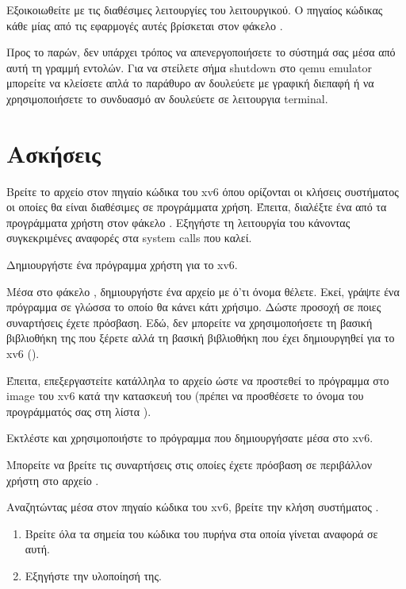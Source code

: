 \documentclass[18pt]{extarticle}
\begin{document}
Εξοικοιωθείτε με τις διαθέσιμες λειτουργίες του λειτουργικού. Ο πηγαίος κώδικας κάθε μίας από τις εφαρμογές αυτές βρίσκεται στον φάκελο .

Προς το παρών, δεν υπάρχει τρόπος να απενεργοποιήσετε το σύστημά σας μέσα από
αυτή τη γραμμή εντολών. Για να στείλετε σήμα shutdown στο qemu emulator
μπορείτε να κλείσετε απλά το παράθυρο αν δουλεύετε με γραφική διεπαφή ή να
χρησιμοποιήσετε το συνδυασμό  αν δουλεύετε σε λειτουργια terminal.

\section{Ασκήσεις}

\begin{question}
    Βρείτε το αρχείο στον πηγαίο κώδικα του xv6 όπου ορίζονται οι κλήσεις συστήματος οι οποίες θα είναι διαθέσιμες σε προγράμματα χρήση.
    Έπειτα, διαλέξτε ένα από τα προγράμματα χρήστη στον φάκελο . Εξηγήστε τη λειτουργία του κάνοντας συγκεκριμένες αναφορές στα system calls που καλεί.
\end{question}

\begin{question}
    Δημιουργήστε ένα πρόγραμμα χρήστη για το xv6.

    Μέσα στο φάκελο , δημιουργήστε ένα αρχείο με ό'τι όνομα θέλετε. Εκεί, γράψτε ένα πρόγραμμα
    σε γλώσσα  το οποίο θα κάνει κάτι χρήσιμο. Δώστε προσοχή 
    σε ποιες συναρτήσεις έχετε πρόσβαση. Εδώ, δεν μπορείτε να χρησιμοποήσετε τη βασική βιβλιοθήκη της  που ξέρετε
    αλλά τη βασική βιβλιοθήκη που έχει δημιουργηθεί για το xv6 ().

    Έπειτα, επεξεργαστείτε κατάλληλα το αρχείο  ώστε να προστεθεί το πρόγραμμα στο image του xv6 κατά την κατασκευή του (πρέπει να προσθέσετε το όνομα του προγράμματός σας στη λίστα ).

    Εκτλέστε  και χρησιμοποιήστε το πρόγραμμα που δημιουργήσατε μέσα στο xv6.

    \begin{info}[Σημείωση:]
        Μπορείτε να βρείτε τις συναρτήσεις στις οποίες έχετε πρόσβαση σε περιβάλλον χρήστη στο αρχείο .
    \end{info}

\end{question}

\begin{question}
    Αναζητώντας μέσα στον πηγαίο κώδικα του xv6, βρείτε την 
    κλήση συστήματος .

    \begin{enumerate}
        \item Βρείτε όλα τα σημεία του κώδικα του πυρήνα στα οποία γίνεται αναφορά σε αυτή.
        \item Εξηγήστε την υλοποίησή της.
    \end{enumerate}
\end{question}
\end{document}
